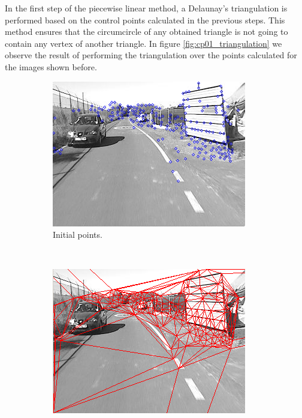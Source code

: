 In the first step of the piecewise linear method, a Delaunay’s triangulation is performed based on the control points calculated in the previous steps. This method ensures that the circumcircle of any obtained triangle is not going to contain any vertex of another triangle. In figure \ref{fig:cp01_triangulation} we observe the result of performing the triangulation over the points calculated for the images shown before.

\begin{figure}[h!]
        \centering
        \begin{subfigure}[b]{0.45\textwidth}
                \centering
                \includegraphics[width=\textwidth]{triangulation1}
                \caption{Initial points.}\label{fig:cp01_triangulation_1}
        \end{subfigure}%
        ~ %
        \begin{subfigure}[b]{0.45\textwidth}
                \centering
                \includegraphics[width=\textwidth]{triangulation2}

\end{subfigure}
\end{figure}
